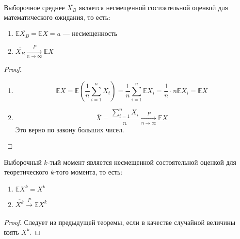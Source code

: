 \begin{theorem}
    Выборочное среднее \(\overline{X_B}\) является несмещенной состоятельной оценкой для математического ожидания, то есть:
    \begin{enumerate}
        \item \(\mathbb{E} \overline{X_B} = \mathbb{E} X = a\) --- несмещенность
        \item \(\overline{X_B} \xrightarrow[n \to \infty ]{P} \mathbb{E} X\)
    \end{enumerate}
\end{theorem}
\begin{proof}\itemfix
    \begin{enumerate}
        \item \[\mathbb{E} \overline{X} = \mathbb{E} \left( \frac{1}{n} \sum_{i=1}^{n} X_i \right) = \frac{1}{n} \sum_{i=1}^{n} \mathbb{E} X_i = \frac{1}{n} \cdot n \mathbb{E} X_i = \mathbb{E} X\]
        \item \[\overline{X} = \frac{\sum_{i=1}^{n} X_i}{n} \xrightarrow[n \to \infty ]{P} \mathbb{E} X\]
              Это верно по закону больших чисел.
    \end{enumerate}
\end{proof}

\begin{theorem}
    Выборочный \(k\)-тый момент является несмещенной состоятельной оценкой для теоретического \(k\)-того момента, то есть:
    \begin{enumerate}
        \item \(\mathbb{E} \overline{X^k} = X^k\)
        \item \(\overline{X^k} \xrightarrow[]{P} \mathbb{E} X^k\)
    \end{enumerate}
\end{theorem}
\begin{proof}
    Следует из предыдущей теоремы, если в качестве случайной величины взять \(X^k\).
\end{proof}

